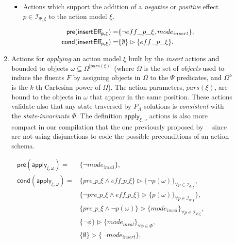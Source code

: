 \documentclass{article}
\newcommand{\pre}{\mathsf{pre}}     %
\newcommand{\cond}{\mathsf{cond}}   %
\begin{document}
\begin{itemize}
\begin{enumerate}
\begin{itemize}
\item Actions which support the addition of a {\em negative} or {\em positive} effect $p\in {\mathcal I}_{\Psi,\xi}$ to the action model $\xi$. 

\begin{small}
\begin{align*}
\hspace*{7pt}\pre(\mathsf{insertEff_{p,\xi}})=&\{\neg eff\_p\_\xi, mode_{insert}\},\\
\cond(\mathsf{insertEff_{p,\xi}})=&\{\emptyset\}\rhd\{eff\_p\_\xi\}.
\end{align*}
\end{small}
\end{itemize}

\item Actions for {\em applying} an action model $\xi$ built by the {\em insert} actions and bounded to objects $\omega\subseteq\Omega^{|pars(\xi)|}$ (where $\Omega$ is the set of {\em objects} used to induce the fluents $F$ by assigning objects in $\Omega$ to the $\Psi$ predicates, and $\Omega^k$ is the $k$-th Cartesian power of $\Omega$). The action parameters, $pars(\xi)$, are bound to the objects in $\omega$ that appear in the same position. These actions validate also that any state traversed by $P_{\Lambda}$ solutions is {\em consistent} with the {\em state-invariants} $\Phi$. The definition $\mathsf{apply_{\xi,\omega}}$ actions is also more compact in our compilation that the one previously proposed by~\citeauthor{aineto2018learning}~\citeyear{aineto2018learning} since are not using disjunctions to code the possible preconditions of an action schema.
\end{enumerate}
\end{itemize}

\begin{small}
\begin{align*}
\pre(\mathsf{apply_{\xi,\omega}})=&\{\neg mode_{inval}\},\\
\cond(\mathsf{apply_{\xi,\omega}})=&\{pre\_p\_\xi\wedge eff\_p\_\xi\}\rhd\{\neg p(\omega)\}_{\forall p\in{\mathcal I}_{\Psi,\xi}},\\
&\{\neg pre\_p\_\xi \wedge eff\_p\_\xi\}\rhd\{p(\omega)\}_{\forall p\in{\mathcal I}_{\Psi,\xi}}\},\\
&\{pre\_p\_\xi \wedge \neg p(\omega)\}\rhd\{mode_{inval}\}_{\forall p\in{\mathcal I}_{\Psi,\xi}},\\
&\{\neg\phi\}\rhd\{mode_{inval}\}_{\forall \phi\in\Phi},\\
&\{\emptyset\}\rhd\{\neg mode_{insert}\},
\end{align*}
\end{small}
\end{document}
